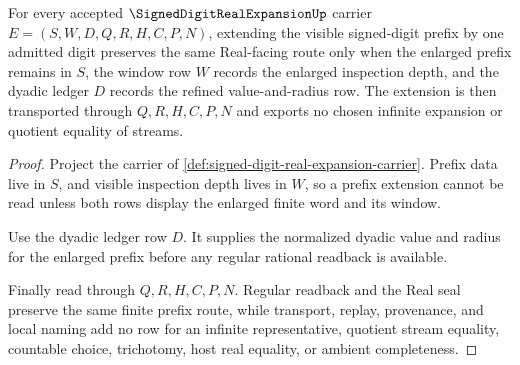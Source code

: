 \begin{theorem}
\label{thm:signed-digit-real-expansion-prefix-stability}
For every accepted $\SignedDigitRealExpansionUp$ carrier $E=(S,W,D,Q,R,H,C,P,N)$, extending the visible signed-digit prefix by one admitted digit preserves the same Real-facing route only when the enlarged prefix remains in $S$, the window row $W$ records the enlarged inspection depth, and the dyadic ledger $D$ records the refined value-and-radius row. The extension is then transported through $Q,R,H,C,P,N$ and exports no chosen infinite expansion or quotient equality of streams.
\end{theorem}
\begin{proof}
Project the carrier of \autoref{def:signed-digit-real-expansion-carrier}. Prefix data live in $S$, and visible inspection depth lives in $W$, so a prefix extension cannot be read unless both rows display the enlarged finite word and its window.

Use the dyadic ledger row $D$. It supplies the normalized dyadic value and radius for the enlarged prefix before any regular rational readback is available.

Finally read through $Q,R,H,C,P,N$. Regular readback and the Real seal preserve the same finite prefix route, while transport, replay, provenance, and local naming add no row for an infinite representative, quotient stream equality, countable choice, trichotomy, host real equality, or ambient completeness.
\end{proof}

